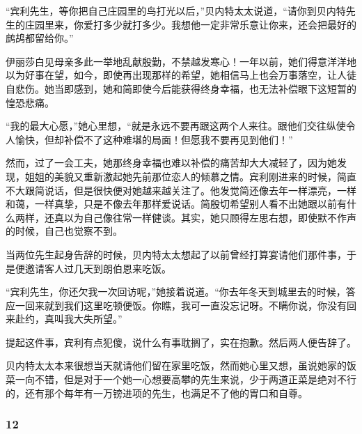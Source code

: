 \par “宾利先生，等你把自己庄园里的鸟打光以后，”贝内特太太说道，“请你到贝内特先生的庄园里来，你爱打多少就打多少。我想他一定非常乐意让你来，还会把最好的鹧鸪都留给你。”
\par 伊丽莎白见母亲多此一举地乱献殷勤，不禁越发寒心！一年以前，她们得意洋洋地以为好事在望，如今，即使再出现那样的希望，她相信马上也会万事落空，让人徒自悲伤。她当即感到，她和简即使今后能获得终身幸福，也无法补偿眼下这短暂的惶恐悲痛。
\par “我的最大心愿，”她心里想，“就是永远不要再跟这两个人来往。跟他们交往纵使令人愉快，但却补偿不了这种难堪的局面！但愿我不要再见到他们！”
\par 然而，过了一会工夫，她那终身幸福也难以补偿的痛苦却大大减轻了，因为她发现，姐姐的美貌又重新激起她先前那位恋人的倾慕之情。宾利刚进来的时候，简直不大跟简说话，但是很快便对她越来越关注了。他发觉简还像去年一样漂亮，一样和蔼，一样真挚，只是不像去年那样爱说话。简殷切希望别人看不出她跟以前有什么两样，还真以为自己像往常一样健谈。其实，她只顾得左思右想，即使默不作声的时候，自己也觉察不到。
\par 当两位先生起身告辞的时候，贝内特太太想起了以前曾经打算宴请他们那件事，于是便邀请客人过几天到朗伯恩来吃饭。
\par “宾利先生，你还欠我一次回访呢，”她接着说道。“你去年冬天到城里去的时候，答应一回来就到我们这里吃顿便饭。你瞧，我可一直没忘记呀。不瞒你说，你没有回来赴约，真叫我大失所望。”
\par 提起这件事，宾利有点犯傻，说什么有事耽搁了，实在抱歉。然后两人便告辞了。
\par 贝内特太太本来很想当天就请他们留在家里吃饭，然而她心里又想，虽说她家的饭菜一向不错，但是对于一个她一心想要高攀的先生来说，少于两道正菜是绝对不行的，还有那个每年有一万镑进项的先生，也满足不了他的胃口和自尊。



\subsubsection*{12}


